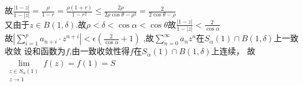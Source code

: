 \documentclass[b5paper,decoration]{qyxf-book}%
\begin{document}
故$\displaystyle{\frac{|1-z|}{1-|z|}=\frac{\rho}{1-r}=\frac{\rho(1+r)}{1-r^2}
\leq\frac{2\rho}{2\rho\cos\theta-\rho^2}=\frac{2}{2\cos\theta-\rho}}$\\
又由于$z\in B(1,\delta).$故$\rho<\delta<\cos\alpha<\cos\theta$故$\displaystyle{\frac{|1-z|}{1-|z|}<\frac{2}{\cos\alpha}}$\\
故$\displaystyle{\left|\sum\limits_{i=1}^pa_{n+i}\cdot z^{n+i}\right|<\epsilon(\frac{2}{\cos\alpha}+1)}$
,故$\displaystyle{\sum\limits_{n=0}^\infty a_nz^n}$在$\displaystyle{S_\alpha(1)\cap B(1,\delta)}$上一致收敛
设和函数为$f$,由一致收敛性得$f$在$\displaystyle{S_\alpha(1)\cap B(1,\delta)}$上连续，
故$\displaystyle{\lim\limits_{\substack{z\in S_\alpha(1)\\z\to 1}}f(z)=f(1)=S}$\\\rightline{$\square$}
\end{document}
